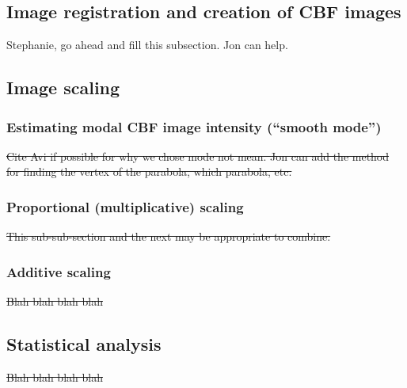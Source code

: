 \subsection{Image registration and creation of CBF images}
Stephanie, go ahead and fill this subsection. Jon can help.

\subsection{Image scaling}
\subsubsection{Estimating modal CBF image intensity (``smooth mode'')}
\sout{Cite Avi if possible for why we chose mode not mean. Jon can add the method for finding the vertex of the parabola, which parabola, etc.} 
\subsubsection{Proportional (multiplicative) scaling}
\sout{This sub-sub-section and the next may be appropriate to combine.}
\subsubsection{Additive scaling}
\sout{Blah blah blah blah}

\subsection{Statistical analysis}
\sout{Blah blah blah blah}
